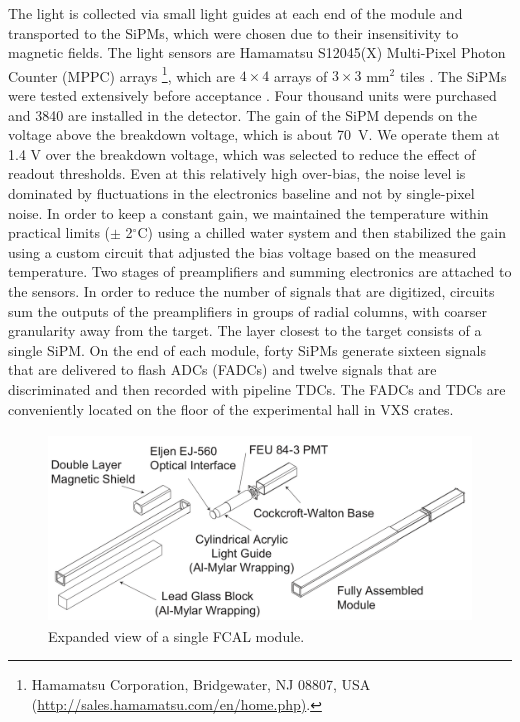 The light is collected via small light guides at each end of the module and transported to the SiPMs, which were chosen due to their insensitivity to magnetic fields. 
The light sensors are Hamamatsu S12045(X) Multi-Pixel Photon Counter (MPPC) arrays \footnote{Hamamatsu Corporation, Bridgewater, NJ 08807, USA \\ (\url{http://sales.hamamatsu.com/en/home.php)}.}, 
which are $4\times4$ arrays of $3\times3$ mm$^2$ tiles \cite{hdnote2913}.
The SiPMs were tested extensively before acceptance
\cite{Barbosa2012100,Qiang2013234,soto,Soto201489,doi:10.1063/1.4955340}.
Four thousand units were purchased and 3840 are installed in the detector.
The gain of the SiPM depends on the voltage above the breakdown voltage, which is about 70~V. We operate them at 1.4 V over the breakdown voltage, which was selected to reduce the effect of readout thresholds. Even at this relatively high over-bias, the noise level is dominated by fluctuations in the electronics baseline and not by single-pixel noise. In order to keep a constant gain, 
we maintained the temperature within practical limits ($\pm$ 2$^\circ$C) 
using a chilled water system and then stabilized the gain 
using a custom circuit that adjusted the bias voltage based on the measured temperature. Two stages of preamplifiers and summing electronics are attached to the sensors. In order to reduce the number of signals that are digitized, circuits sum the outputs of the preamplifiers in groups of radial columns, with coarser granularity away from the target. The layer closest to the target consists of a single SiPM. On the end of each module, forty SiPMs generate sixteen signals that are delivered to flash ADCs (FADCs) and twelve signals that are discriminated and then recorded with pipeline TDCs. The FADCs and TDCs are conveniently located on the floor of the experimental hall in VXS crates.
  
  
\begin{figure}[tbp]\centering
\includegraphics[height=5cm]{figures/FCAL_single_module}
\caption{\label{fig:fcal:FCAL_single_module}
    Expanded view of a single FCAL module.
  }
\end{figure} 
